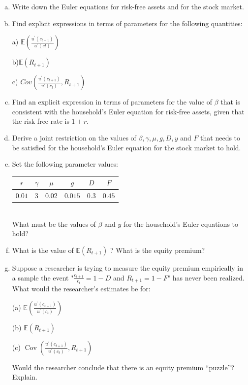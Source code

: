 \documentclass[11pt]{extarticle}
\theoremstyle{plain}
\theoremstyle{definition}
\begin{document}
\begin{enumerate}[(a)]
\item Write down the Euler equations for risk-free assets and for the stock market.

\item  Find explicit expressions in terms of parameters for the following quantities:

a) $\mathbb{E}\left(\frac{u^{\prime}\left(c_{t+1}\right)}{u^{\prime}(c t)}\right)$

b)$\mathbb{E}\left(R_{t+1}\right)$

c) $Cov\left(\frac{u^{\prime}\left(c_{t+1}\right)}{u^{\prime}\left(c_{t}\right)},R_{t+1}\right)$


\item Find an explicit expression in terms of parameters for the value of $\beta$ that is consistent with
the household’s Euler equation for risk-free assets, given that the risk-free rate is $1 + r$.

\item Derive a joint restriction on the values of $\beta, \gamma, \mu, g, D, y$ and $F$ that needs to be satisfied for the household's Euler equation for the stock market to hold.

\item Set the following parameter values: \\

\begin{tabular}{|c|c|c|c|c|c|}
\hline$r$ & $\gamma$ & $\mu$ & $g$ & $D$ & $F$ \\
\hline $0.01$ & 3 & $0.02$ & $0.015$ & $0.3$ & $0.45$ \\
\hline
\end{tabular}\\

What must be the values of $\beta$ and $y$ for the household's Euler equations to hold?

\item What is the value of $\mathbb{E}\left(R_{t+1}\right)$ ? What is the equity premium?

\item Suppose a researcher is trying to measure the equity premium empirically in a sample  the event "$\frac{c_{t+1}}{c_{t}}=1-D$ and $R_{t+1}=1-F$" has never been realized. What would the researcher's estimates be for:

(a) $\mathbb{E}\left(\frac{u^{\prime}\left(c_{t+1}\right)}{u^{\prime}\left(c_t\right)}\right)$

(b) $\mathbb{E}\left(R_{t+1}\right)$


(c) $\operatorname{Cov}\left(\frac{u^{\prime}\left(c_{t+1}\right)}{u^{\prime}\left(c_t\right)}, R_{t+1}\right)$

Would the researcher conclude that there is an equity premium “puzzle”? Explain.
\end{enumerate}
\end{document}
